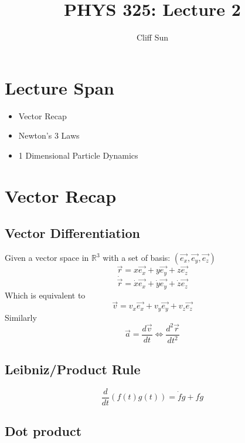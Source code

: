 \documentclass{article}
\title{PHYS 325: Lecture 2}
\author{Cliff Sun}
\newtheorem{one minute paper}[theorem]{One Minute Paper}
\begin{document}
\maketitle

\section*{Lecture Span}
\begin{itemize}
    \item Vector Recap
    \item Newton's 3 Laws
    \item 1 Dimensional Particle Dynamics
\end{itemize}

\section*{Vector Recap}
\subsection*{Vector Differentiation}
Given a vector space in $\mathbb{R}^3$ with a set of basis: $(\vec{e_x}, \vec{e_y}, \vec{e_z})$
\begin{equation}
    \vec{r} = x\vec{e_x} + y\vec{e_y} + z\vec{e_z}
\end{equation}
\begin{equation}
    \dot{\vec{r}} = \dot{x}\vec{e_x} + \dot{y}\vec{e_y} + \dot{z}\vec{e_z}
\end{equation}
Which is equivalent to 
\begin{equation}
    \vec{v} = v_x\vec{e_x} + v_y\vec{e_y} + v_z\vec{e_z}
\end{equation}
Similarly
\begin{equation}
    \vec{a} = \frac{d\vec{v}}{dt} \iff \frac{d^2\vec{r}}{dt^2}
\end{equation}

\subsection*{Leibniz/Product Rule}
\begin{equation}
    \frac{d}{dt}(f(t)g(t)) = \dot{f}g + f\dot{g}
\end{equation}

\subsection*{Dot product}
\end{document}
